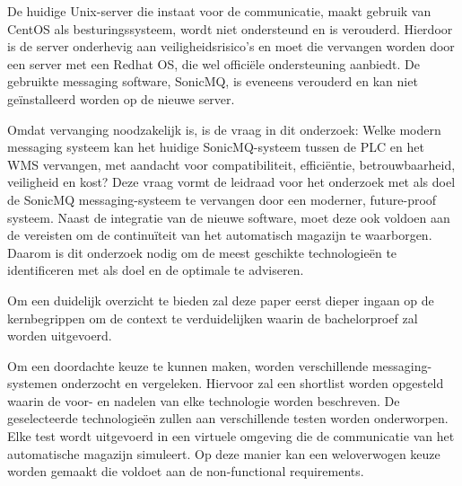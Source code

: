 De huidige Unix-server die instaat voor de communicatie, maakt gebruik van \mbox{CentOS} als besturingssysteem,
wordt niet ondersteund en is verouderd.
Hierdoor is de server onderhevig aan veiligheidsrisico's en moet die vervangen worden door een server met een Redhat OS, 
die wel officiële ondersteuning aanbiedt.
De gebruikte messaging software, SonicMQ, is eveneens verouderd en kan niet geïnstalleerd worden op de nieuwe server. 
\newline

Omdat vervanging noodzakelijk is, is de vraag in dit onderzoek: 
Welke modern messaging systeem kan het huidige SonicMQ-systeem tussen de PLC en het WMS vervangen, 
met aandacht voor compatibiliteit, efficiëntie, betrouwbaarheid, veiligheid en kost?
Deze vraag vormt de leidraad voor het onderzoek met als doel 
de SonicMQ messaging-systeem te vervangen door een moderner, future-proof systeem.
Naast de integratie van de nieuwe software, moet deze ook voldoen aan de vereisten
om de continuïteit van het automatisch magazijn te waarborgen. 
Daarom is dit onderzoek nodig om de meest geschikte technologieën te identificeren met als doel en de optimale te adviseren.
\newline

Om een duidelijk overzicht te bieden zal deze paper eerst dieper ingaan op de kernbegrippen 
om de context te verduidelijken waarin de bachelorproef zal worden uitgevoerd.

Om een doordachte keuze te kunnen maken, worden verschillende messaging-systemen onderzocht en vergeleken.
Hiervoor zal een shortlist worden opgesteld waarin de voor- en nadelen van elke technologie worden beschreven.
De geselecteerde technologieën zullen aan verschillende testen worden onderworpen. 
Elke test wordt uitgevoerd in een virtuele omgeving die de communicatie van het automatische magazijn simuleert. 
Op deze manier kan een weloverwogen keuze worden gemaakt die voldoet aan de non-functional requirements.